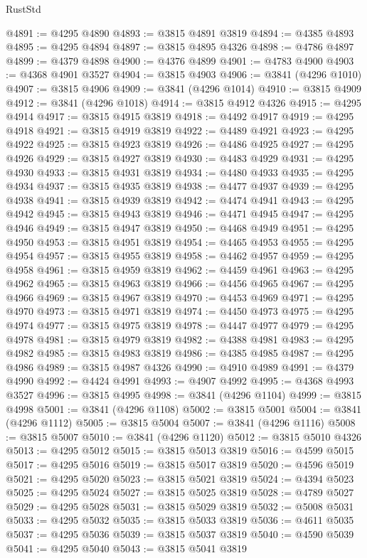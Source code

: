 \begin{lexlean}{RustStd}
\begin{coremodule}
@4891 := @4295 @4890
@4893 := @3815 @4891 @3819
@4894 := @4385 @4893
@4895 := @4295 @4894
@4897 := @3815 @4895 @4326
@4898 := @4786 @4897
@4899 := @4379 @4898
@4900 := @4376 @4899
@4901 := @4783 @4900
@4903 := @4368 @4901 @3527
@4904 := @3815 @4903
@4906 := @3841 (@4296 @1010)
@4907 := @3815 @4906
@4909 := @3841 (@4296 @1014)
@4910 := @3815 @4909
@4912 := @3841 (@4296 @1018)
@4914 := @3815 @4912 @4326
@4915 := @4295 @4914
@4917 := @3815 @4915 @3819
@4918 := @4492 @4917
@4919 := @4295 @4918
@4921 := @3815 @4919 @3819
@4922 := @4489 @4921
@4923 := @4295 @4922
@4925 := @3815 @4923 @3819
@4926 := @4486 @4925
@4927 := @4295 @4926
@4929 := @3815 @4927 @3819
@4930 := @4483 @4929
@4931 := @4295 @4930
@4933 := @3815 @4931 @3819
@4934 := @4480 @4933
@4935 := @4295 @4934
@4937 := @3815 @4935 @3819
@4938 := @4477 @4937
@4939 := @4295 @4938
@4941 := @3815 @4939 @3819
@4942 := @4474 @4941
@4943 := @4295 @4942
@4945 := @3815 @4943 @3819
@4946 := @4471 @4945
@4947 := @4295 @4946
@4949 := @3815 @4947 @3819
@4950 := @4468 @4949
@4951 := @4295 @4950
@4953 := @3815 @4951 @3819
@4954 := @4465 @4953
@4955 := @4295 @4954
@4957 := @3815 @4955 @3819
@4958 := @4462 @4957
@4959 := @4295 @4958
@4961 := @3815 @4959 @3819
@4962 := @4459 @4961
@4963 := @4295 @4962
@4965 := @3815 @4963 @3819
@4966 := @4456 @4965
@4967 := @4295 @4966
@4969 := @3815 @4967 @3819
@4970 := @4453 @4969
@4971 := @4295 @4970
@4973 := @3815 @4971 @3819
@4974 := @4450 @4973
@4975 := @4295 @4974
@4977 := @3815 @4975 @3819
@4978 := @4447 @4977
@4979 := @4295 @4978
@4981 := @3815 @4979 @3819
@4982 := @4388 @4981
@4983 := @4295 @4982
@4985 := @3815 @4983 @3819
@4986 := @4385 @4985
@4987 := @4295 @4986
@4989 := @3815 @4987 @4326
@4990 := @4910 @4989
@4991 := @4379 @4990
@4992 := @4424 @4991
@4993 := @4907 @4992
@4995 := @4368 @4993 @3527
@4996 := @3815 @4995
@4998 := @3841 (@4296 @1104)
@4999 := @3815 @4998
@5001 := @3841 (@4296 @1108)
@5002 := @3815 @5001
@5004 := @3841 (@4296 @1112)
@5005 := @3815 @5004
@5007 := @3841 (@4296 @1116)
@5008 := @3815 @5007
@5010 := @3841 (@4296 @1120)
@5012 := @3815 @5010 @4326
@5013 := @4295 @5012
@5015 := @3815 @5013 @3819
@5016 := @4599 @5015
@5017 := @4295 @5016
@5019 := @3815 @5017 @3819
@5020 := @4596 @5019
@5021 := @4295 @5020
@5023 := @3815 @5021 @3819
@5024 := @4394 @5023
@5025 := @4295 @5024
@5027 := @3815 @5025 @3819
@5028 := @4789 @5027
@5029 := @4295 @5028
@5031 := @3815 @5029 @3819
@5032 := @5008 @5031
@5033 := @4295 @5032
@5035 := @3815 @5033 @3819
@5036 := @4611 @5035
@5037 := @4295 @5036
@5039 := @3815 @5037 @3819
@5040 := @4590 @5039
@5041 := @4295 @5040
@5043 := @3815 @5041 @3819

\end{coremodule}
\end{lexlean}
